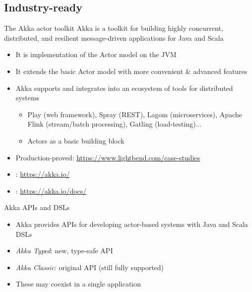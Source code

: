\documentclass[presentation, 9pt]{beamer}\mode<presentation>{\usetheme{AMSBolognaFC}}
\begin{document}
\subsection{Industry-ready}
\begin{frame}[c]{The Akka actor toolkit}
Akka is a toolkit for building highly concurrent, distributed, and resilient
message-driven applications for Java and Scala
\begin{itemize}
	\item It is  implementation of the Actor model on the JVM
	\item It extends the basic Actor model with more convenient \& advanced features
	\item Akka supports and integrates into an ecosystem of tools for distributed systems
 \begin{itemize}
		\item Play (web framework), Spray (REST), Lagom (microservices), Apache Flink (stream/batch
		processing), Gatling (load-testing)...
		\item Actors as a basic building block
 \end{itemize}
 \item Production-proved: \url{https://www.lightbend.com/case-studies}
 \item {}: \url{https://akka.io/}
 \item {}: \url{https://akka.io/docs/}
\end{itemize}
\begin{alertblock}{Akka APIs and DSLs \href{https://doc.akka.io/docs/akka/current/typed/from-classic.html}{\faLink}}
	\begin{itemize}
		\item Akka provides APIs for developing actor-based systems with Java and Scala DSLs
		\item \emph{Akka Typed}: new, type-safe API
		\item \emph{Akka Classic}: original API (still fully supported)
		\item These may coexist in a single application
	\end{itemize}
\end{alertblock}
\end{frame}
\end{document}
